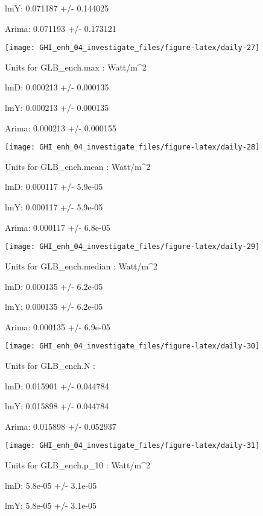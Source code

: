 \documentclass[
  10pt,
  a4paper,oneside]{article}
\begin{document}
lmY: 0.071187 +/- 0.144025

Arima: 0.071193 +/- 0.173121

\begin{center}\texttt{[image: GHI\_enh\_04\_investigate\_files/figure-latex/daily-27]} \end{center}

Units for GLB\_ench.max : Watt/m\^{}2

lmD: 0.000213 +/- 0.000135

lmY: 0.000213 +/- 0.000135

Arima: 0.000213 +/- 0.000155

\begin{center}\texttt{[image: GHI\_enh\_04\_investigate\_files/figure-latex/daily-28]} \end{center}

Units for GLB\_ench.mean : Watt/m\^{}2

lmD: 0.000117 +/- 5.9e-05

lmY: 0.000117 +/- 5.9e-05

Arima: 0.000117 +/- 6.8e-05

\begin{center}\texttt{[image: GHI\_enh\_04\_investigate\_files/figure-latex/daily-29]} \end{center}

Units for GLB\_ench.median : Watt/m\^{}2

lmD: 0.000135 +/- 6.2e-05

lmY: 0.000135 +/- 6.2e-05

Arima: 0.000135 +/- 6.9e-05

\begin{center}\texttt{[image: GHI\_enh\_04\_investigate\_files/figure-latex/daily-30]} \end{center}

Units for GLB\_ench.N :

lmD: 0.015901 +/- 0.044784

lmY: 0.015898 +/- 0.044784

Arima: 0.015898 +/- 0.052937

\begin{center}\texttt{[image: GHI\_enh\_04\_investigate\_files/figure-latex/daily-31]} \end{center}

Units for GLB\_ench.p\_10 : Watt/m\^{}2

lmD: 5.8e-05 +/- 3.1e-05

lmY: 5.8e-05 +/- 3.1e-05
\end{document}
